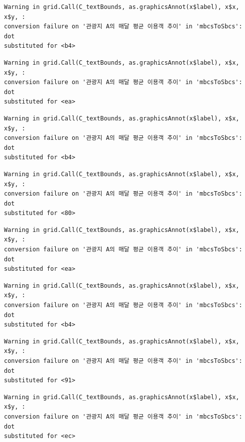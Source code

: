 \documentclass[
  letterpaper,
  DIV=11,
  numbers=noendperiod]{scrreprt}
\begin{document}
\begin{verbatim}
Warning in grid.Call(C_textBounds, as.graphicsAnnot(x$label), x$x, x$y, :
conversion failure on '관광지 A의 매달 평균 이용객 추이' in 'mbcsToSbcs': dot
substituted for <b4>
\end{verbatim}

\begin{verbatim}
Warning in grid.Call(C_textBounds, as.graphicsAnnot(x$label), x$x, x$y, :
conversion failure on '관광지 A의 매달 평균 이용객 추이' in 'mbcsToSbcs': dot
substituted for <ea>
\end{verbatim}

\begin{verbatim}
Warning in grid.Call(C_textBounds, as.graphicsAnnot(x$label), x$x, x$y, :
conversion failure on '관광지 A의 매달 평균 이용객 추이' in 'mbcsToSbcs': dot
substituted for <b4>
\end{verbatim}

\begin{verbatim}
Warning in grid.Call(C_textBounds, as.graphicsAnnot(x$label), x$x, x$y, :
conversion failure on '관광지 A의 매달 평균 이용객 추이' in 'mbcsToSbcs': dot
substituted for <80>
\end{verbatim}

\begin{verbatim}
Warning in grid.Call(C_textBounds, as.graphicsAnnot(x$label), x$x, x$y, :
conversion failure on '관광지 A의 매달 평균 이용객 추이' in 'mbcsToSbcs': dot
substituted for <ea>
\end{verbatim}

\begin{verbatim}
Warning in grid.Call(C_textBounds, as.graphicsAnnot(x$label), x$x, x$y, :
conversion failure on '관광지 A의 매달 평균 이용객 추이' in 'mbcsToSbcs': dot
substituted for <b4>
\end{verbatim}

\begin{verbatim}
Warning in grid.Call(C_textBounds, as.graphicsAnnot(x$label), x$x, x$y, :
conversion failure on '관광지 A의 매달 평균 이용객 추이' in 'mbcsToSbcs': dot
substituted for <91>
\end{verbatim}

\begin{verbatim}
Warning in grid.Call(C_textBounds, as.graphicsAnnot(x$label), x$x, x$y, :
conversion failure on '관광지 A의 매달 평균 이용객 추이' in 'mbcsToSbcs': dot
substituted for <ec>
\end{verbatim}
\end{document}
